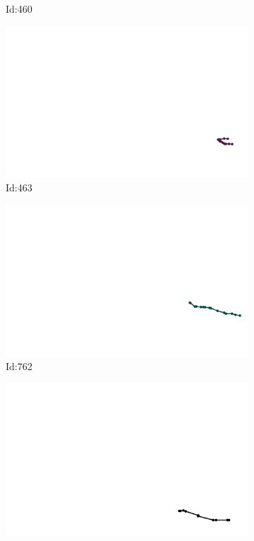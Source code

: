 \documentclass[12pt,twoside]{report}
\begin{document}
\begin{figure}
\begin{subfigure}[b]{0.20\textwidth}
\caption{Id:460}
\end{subfigure}
\begin{subfigure}[b]{0.20\textwidth}
\centering
\includegraphics[width=\textwidth]{../trajectories/463.png}
\caption{Id:463}
\end{subfigure}
\begin{subfigure}[b]{0.20\textwidth}
\centering
\includegraphics[width=\textwidth]{../trajectories/762.png}
\caption{Id:762}
\end{subfigure}
\begin{subfigure}[b]{0.20\textwidth}
\centering
\includegraphics[width=\textwidth]{../trajectories/787.png}

\end{subfigure}
\end{figure}
\end{document}
